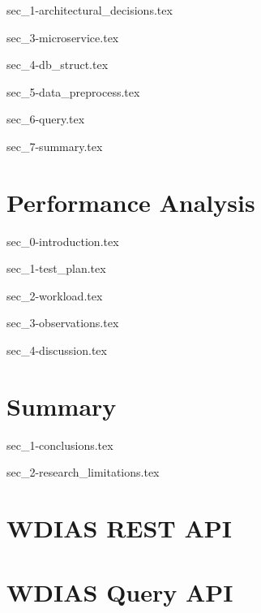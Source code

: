 \documentclass[a4paper,oneside,12pt]{report}
\begin{document}
{sec_1-architectural_decisions.tex}

{sec_3-microservice.tex}

{sec_4-db_struct.tex}

{sec_5-data_preprocess.tex}

{sec_6-query.tex}

{sec_7-summary.tex}

\chapter{Performance Analysis}
\label{ch:results}

{sec_0-introduction.tex}

{sec_1-test_plan.tex}

{sec_2-workload.tex}

{sec_3-observations.tex}

{sec_4-discussion.tex}

\chapter{Summary}
\label{ch:summary}

{sec_1-conclusions.tex}

{sec_2-research_limitations.tex}


\graphicspath{ {./images/} }

% 
% 

\renewcommand*{\UrlFont}{\rmfamily}
\printbibliography[title={References}]

\begin{appendices}
    \chapter{WDIAS REST API}
    
    \chapter{WDIAS Query API}
    
\end{appendices}

% 
% 
\end{document}
